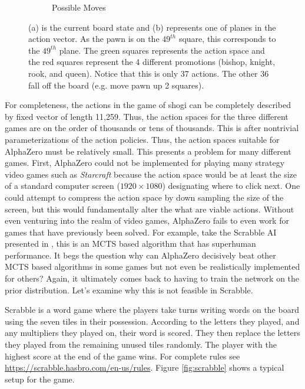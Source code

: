 \documentclass{article}
\begin{document}
\begin{figure}[H]
\begin{subfigure}[h]{0.48\linewidth}
      \caption{Possible Moves}
    \end{subfigure}%
    \caption[Example of chess action vector]{(a) is the current board state and (b) represents one of planes in the action vector. As the pawn is on the $49^{th}$ square, this corresponds to the $49^{th}$ plane. The green squares represents the action space and the red squares represent the 4 different promotions (bishop, knight, rook, and queen). Notice that this is only 37 actions. The other 36 fall off the board (e.g. move pawn up 2 squares).}
    \label{fig:chess}
  \end{figure}

  For completeness, the actions in the game of shogi can be completely described by fixed vector of length 11,259. Thus, the action spaces for the three different games are on the order of thousands or tens of thousands. This is after nontrivial parameterizations of the action policies. Thus, the action spaces suitable for AlphaZero must be relatively small. This presents a problem for many different games. First, AlphaZero could not be implemented for playing many strategy video games such as \textit{Starcraft} because the action space would be at least the size of a standard computer screen ($1920 \times 1080$) designating where to click next. One could attempt to compress the action space by down sampling the size of the screen, but this would fundamentally alter the what are viable actions. Without even venturing into the realm of video games, AlphaZero fails to even work for games that have previously been solved. For example, take the Scrabble AI presented in \cite{sheppard_world-championship-caliber_2002}, this is an MCTS based algorithm that has superhuman performance. It begs the question why can AlphaZero decisively beat other MCTS based algorithms in some games but not even be realistically implemented for others? Again, it ultimately comes back to having to train the network on the prior distribution. Let's examine why this is not feasible in Scrabble.

  Scrabble is a word game where the players take turns writing words on the board using the seven tiles in their possession. According to the letters they played, and any multipliers they played on, their word is scored. They then replace the letters they played from the remaining unused tiles randomly. The player with the highest score at the end of the game wins. For complete rules see \url{https://scrabble.hasbro.com/en-us/rules}. Figure \ref{fig:scrabble} shows a typical setup for the game.
\end{document}
